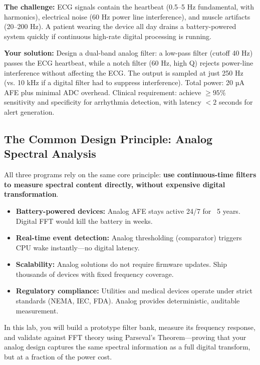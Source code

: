 \documentclass[11pt,letterpaper]{article}
\begin{document}
\textbf{The challenge:} ECG signals contain the heartbeat (0.5--5 Hz fundamental, with harmonics), electrical noise (60 Hz power line interference), and muscle artifacts (20--200 Hz). A patient wearing the device all day drains a battery-powered system quickly if continuous high-rate digital processing is running.

\textbf{Your solution:} Design a dual-band analog filter: a low-pass filter (cutoff 40 Hz) passes the ECG heartbeat, while a notch filter (60 Hz, high Q) rejects power-line interference without affecting the ECG. The output is sampled at just 250 Hz (vs. 10 kHz if a digital filter had to suppress interference). Total power: 20 µA AFE plus minimal ADC overhead. Clinical requirement: achieve $\geq 95\%$ sensitivity and specificity for arrhythmia detection, with latency $< 2$ seconds for alert generation.

\subsection{The Common Design Principle: Analog Spectral Analysis}

All three programs rely on the same core principle: \textbf{use continuous-time filters to measure spectral content directly, without expensive digital transformation}.

\begin{itemize}
    \item \textbf{Battery-powered devices:} Analog AFE stays active 24/7 for ~5 years. Digital FFT would kill the battery in weeks.
    \item \textbf{Real-time event detection:} Analog thresholding (comparator) triggers CPU wake instantly—no digital latency.
    \item \textbf{Scalability:} Analog solutions do not require firmware updates. Ship thousands of devices with fixed frequency coverage.
    \item \textbf{Regulatory compliance:} Utilities and medical devices operate under strict standards (NEMA, IEC, FDA). Analog provides deterministic, auditable measurement.
\end{itemize}

\noindent
In this lab, you will build a prototype filter bank, measure its frequency response, and validate against FFT theory using Parseval's Theorem—proving that your analog design captures the same spectral information as a full digital transform, but at a fraction of the power cost.

\clearpage
\end{document}
